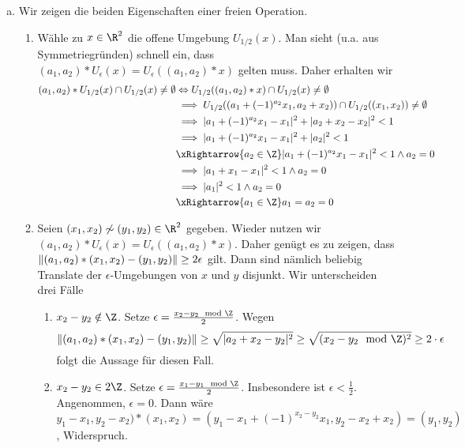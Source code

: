 \documentclass{article}
\begin{document}
\begin{enumerate}[(a)]
    \item Wir zeigen die beiden Eigenschaften einer freien Operation.
    \begin{enumerate}[(1)]
      \item Wähle zu $x \in \R^2$ die offene Umgebung $U_{1/2}(x)$.
      Man sieht (u.a. aus Symmetriegründen) schnell ein, dass $(a_1, a_2) * U_{\epsilon}(x) = U_{\epsilon}((a_1, a_2) * x)$ gelten muss.
      Daher erhalten wir
      \begin{align*}
        (a_1, a_2) * U_{1/2}(x) \cap U_{1/2}(x) \neq \emptyset &\Leftrightarrow U_{1/2}((a_1, a_2) * x) \cap U_{1/2}(x)\neq \emptyset\\
        &\implies U_{1/2}((a_1 + (-1)^{a_2}x_1, a_2 + x_2)) \cap U_{1/2}((x_1, x_2))\neq \emptyset\\
        &\implies |a_1 + (-1)^{a_2}x_1 - x_1|^2 + |a_2 + x_2 - x_2|^2 < 1\\
        &\implies |a_1 + (-1)^{a_2}x_1 - x_1|^2 + |a_2|^2 < 1\\
        &\xRightarrow{a_2 \in \Z} |a_1 + (-1)^{a_2}x_1 - x_1|^2 < 1 \land a_2 = 0\\
        &\implies |a_1 + x_1 - x_1|^2 < 1 \land a_2 = 0\\
        &\implies |a_1|^2 < 1 \land a_2 = 0\\
        &\xRightarrow{a_1 \in \Z} a_1 = a_2 = 0
      \end{align*}
      \item Seien $(x_1, x_2) \not \sim (y_1, y_2) \in \R^2$ gegeben. 
      Wieder nutzen wir $(a_1, a_2) * U_{\epsilon}(x) = U_{\epsilon}((a_1, a_2) * x)$.
      Daher genügt es zu zeigen, dass $\lVert (a_1, a_2) * (x_1, x_2) - (y_1, y_2) \rVert \geq 2 \epsilon$ gilt.
      Dann sind nämlich beliebig Translate der $\epsilon$-Umgebungen von $x$ und $y$ disjunkt.
      Wir unterscheiden drei Fälle
      \begin{enumerate}
        \item $x_2 - y_2 \notin \Z$. Setze $\epsilon = \frac{x_2-y_2 \mod \Z}{2}$.
        Wegen 
        \[ 
          \norm{(a_1, a_2) * (x_1, x_2) - (y_1, y_2)} \geq \sqrt{|a_2 + x_2 - y_2|^2} \geq \sqrt{(x_2 - y_2 \mod \Z)^2}
          \geq 2 \cdot \epsilon
        \]
        folgt die Aussage für diesen Fall.
        \item $x_2 - y_2 \in 2\Z$. Setze $\epsilon = \frac{x_1 - y_1 \mod \Z}{2}$.
        Insbesondere ist $\epsilon < \frac{1}{2}$. Angenommen, $\epsilon = 0$. Dann wäre
        $y_1 - x_1, y_2 - x_2)*(x_1, x_2) = (y_1 - x_1 + (-1)^{x_2 - y_2}x_1, y_2 - x_2 + x_2) = (y_1, y_2)$, Widerspruch.

\end{enumerate}
\end{enumerate}
\end{enumerate}
\end{document}
